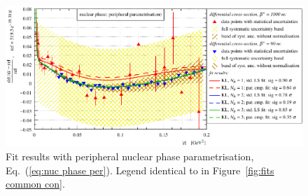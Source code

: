 \begin{figure}
\begin{center}
\includegraphics{fig/fits_common_per.pdf}
\caption{%
Fit results with peripheral nuclear phase parametrisation, Eq.~(\ref{eq:nuc phase per}). Legend identical to in Figure~\ref{fig:fits common con}. 
}
\label{fig:fits common per}
\end{center}
\end{figure}


